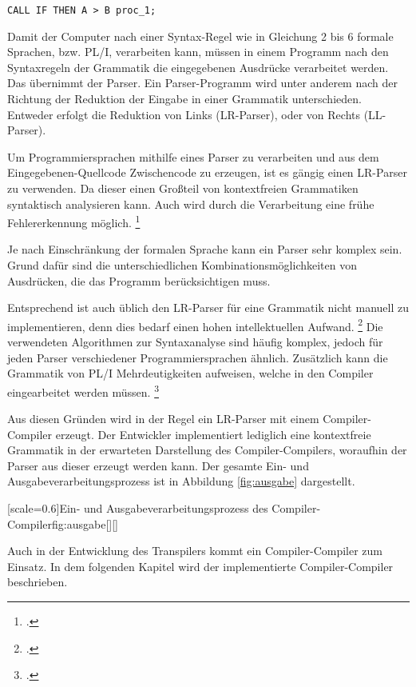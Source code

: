 \begin{lstlisting}[language=PL/I, caption=Ungültiges PL/I, label={lst:pliwrongstatement}]
	CALL IF THEN A > B proc_1;
\end{lstlisting}

Damit der Computer nach einer Syntax-Regel wie in Gleichung 2 bis 6 formale Sprachen, bzw. PL/I, verarbeiten kann, müssen in einem Programm nach den Syntaxregeln der Grammatik die eingegebenen Ausdrücke verarbeitet werden. 
Das übernimmt der Parser. Ein Parser-Programm wird unter anderem nach der Richtung der Reduktion der Eingabe in einer Grammatik unterschieden.
Entweder erfolgt die Reduktion von Links (LR-Parser), oder von Rechts (LL-Parser).

Um Programmiersprachen mithilfe eines Parser zu verarbeiten und aus dem Eingegebenen-Quellcode Zwischencode zu erzeugen, ist es gängig einen LR-Parser zu verwenden.
Da dieser einen Großteil von kontextfreien Grammatiken syntaktisch analysieren kann.
Auch wird durch die Verarbeitung eine frühe Fehlererkennung möglich. \footcite{}

Je nach Einschränkung der formalen Sprache kann ein Parser sehr komplex sein. 
Grund dafür sind die unterschiedlichen Kombinationsmöglichkeiten von Ausdrücken, die das Programm berücksichtigen muss.

Entsprechend ist auch üblich den LR-Parser für eine Grammatik nicht manuell zu implementieren, denn dies bedarf einen hohen intellektuellen Aufwand. \footcite[Vgl. ][S. 27ff. ]{compibau}
Die verwendeten Algorithmen zur Syntaxanalyse sind häufig komplex, jedoch für jeden Parser verschiedener Programmiersprachen ähnlich. 
Zusätzlich kann die Grammatik von PL/I Mehrdeutigkeiten aufweisen, welche in den Compiler eingearbeitet werden müssen.
\footcite[Vgl. ][S. 262ff. ]{compibau}

Aus diesen Gründen wird in der Regel ein LR-Parser mit einem Compiler-Compiler erzeugt.
Der Entwickler implementiert lediglich eine kontextfreie Grammatik in der erwarteten Darstellung des Compiler-Compilers,
woraufhin der Parser aus dieser erzeugt werden kann. Der gesamte Ein- und Ausgabeverarbeitungsprozess ist in Abbildung \ref{fig:ausgabe} dargestellt.


[scale=0.6]{Ein- und Ausgabeverarbeitungsprozess des Compiler-Compiler}{fig:ausgabe}[][]
\pagebreak

Auch in der Entwicklung des Transpilers kommt ein Compiler-Compiler zum Einsatz. In dem folgenden Kapitel wird der implementierte Compiler-Compiler beschrieben.

